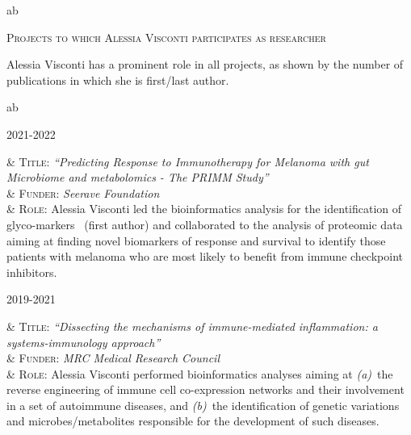 \documentclass[a4paper,10pt]{article}
\newcommand{\smalltitle}[1]{
	\vspace{0.1cm}
	{\noindent 
	\large \textsc{#1}}
	\vspace{0.1cm}
}
\newenvironment{singletablelist}
{	\vspace{-0.2cm}
	\begin{longtable}[!h]{ab}}{\end{longtable}
}
\newcommand{\stlist}[2]{
	\hspace{-3cm}
	\noindent
	\begin{minipage}{0.24\textwidth}
	\begin{flushright}
	\textsc{#1}
	\end{flushright}
	\end{minipage}
	& #2\\[0.2cm]
}
\begin{document}
\begin{singletablelist}
\end{singletablelist}


\smalltitle{Projects to which Alessia Visconti participates as researcher}

\noindent  Alessia Visconti has a prominent role in all projects, as shown by the number of publications in which she is first/last author.

\vspace{0.1cm}

\begin{singletablelist}

	\stlist{2021-2022}{
		\textsc{Title:} \emph{``Predicting Response to Immunotherapy for Melanoma with gut Microbiome and metabolomics - The PRIMM Study''}\\
		& \textsc{Funder:} \emph{Seerave Foundation}\\
		& \textsc{Role:} Alessia Visconti led the bioinformatics analysis for the identification of glyco-markers~\cite{Vis23} (first author) and collaborated to the analysis of proteomic data~\cite{Ros22} aiming at finding novel biomarkers of response and survival to identify those patients with melanoma who are most likely to benefit from immune checkpoint inhibitors.}
	
	\stlist{2019-2021}{ 
		\textsc{Title:} \emph{``Dissecting the mechanisms of immune-mediated inflammation: a systems-immunology approach''}\\
		& \textsc{Funder:} \emph{MRC Medical Research Council}\\
		& \textsc{Role:} Alessia Visconti performed bioinformatics analyses aiming at \emph{(a)}~the reverse engineering of immune cell co-expression networks and their involvement in a set of autoimmune diseases, and \emph{(b)}~the identification of genetic variations and microbes/metabolites responsible for the development of such diseases.}

\end{singletablelist}

\newpage
\end{document}
